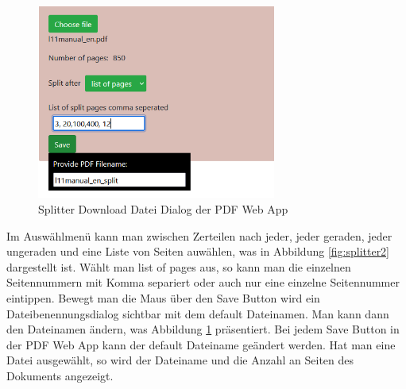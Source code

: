 \begin{figure}[!htbp]
	\centering
	\includegraphics[width=0.7\textwidth]{"images/splitter3.png"}
	\caption{Splitter Download Datei Dialog der PDF Web App}
	\label{fig:splitter3}
\end{figure}

Im Auswählmenü kann man zwischen Zerteilen nach jeder, jeder geraden, jeder ungeraden und eine Liste von Seiten auwählen, was in Abbildung \ref{fig:splitter2} dargestellt ist. Wählt man list of pages aus, so kann man die einzelnen Seitennummern mit Komma separiert oder auch nur eine einzelne Seitennummer eintippen. Bewegt man die Maus über den Save Button wird ein Dateibenennungsdialog sichtbar mit dem default Dateinamen. Man kann dann den Dateinamen ändern, was Abbildung \ref{fig:splitter3} präsentiert. Bei jedem Save Button in der PDF Web App kann der default Dateiname geändert werden. Hat man eine Datei ausgewählt, so wird der Dateiname und die Anzahl an Seiten des Dokuments angezeigt. \\

